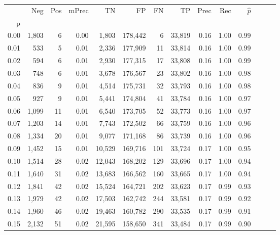 \begin{tabular}{rrrrrrrrrrrrrr}
\toprule
{} &    Neg &  Pos & mPrec &       TN &       FP &      FN &      TP &  Prec &   Rec & $\hat{p}$ \\
p    &        &      &       &          &          &         &         &       &       &           \\
\midrule
0.00 &  1,803 &    6 &  0.00 &    1,803 &  178,442 &       6 &  33,819 &  0.16 &  1.00 &      0.99 \\
0.01 &    533 &    5 &  0.01 &    2,336 &  177,909 &      11 &  33,814 &  0.16 &  1.00 &      0.99 \\
0.02 &    594 &    6 &  0.01 &    2,930 &  177,315 &      17 &  33,808 &  0.16 &  1.00 &      0.99 \\
0.03 &    748 &    6 &  0.01 &    3,678 &  176,567 &      23 &  33,802 &  0.16 &  1.00 &      0.98 \\
0.04 &    836 &    9 &  0.01 &    4,514 &  175,731 &      32 &  33,793 &  0.16 &  1.00 &      0.98 \\
0.05 &    927 &    9 &  0.01 &    5,441 &  174,804 &      41 &  33,784 &  0.16 &  1.00 &      0.97 \\
0.06 &  1,099 &   11 &  0.01 &    6,540 &  173,705 &      52 &  33,773 &  0.16 &  1.00 &      0.97 \\
0.07 &  1,203 &   14 &  0.01 &    7,743 &  172,502 &      66 &  33,759 &  0.16 &  1.00 &      0.96 \\
0.08 &  1,334 &   20 &  0.01 &    9,077 &  171,168 &      86 &  33,739 &  0.16 &  1.00 &      0.96 \\
0.09 &  1,452 &   15 &  0.01 &   10,529 &  169,716 &     101 &  33,724 &  0.17 &  1.00 &      0.95 \\
0.10 &  1,514 &   28 &  0.02 &   12,043 &  168,202 &     129 &  33,696 &  0.17 &  1.00 &      0.94 \\
0.11 &  1,640 &   31 &  0.02 &   13,683 &  166,562 &     160 &  33,665 &  0.17 &  1.00 &      0.94 \\
0.12 &  1,841 &   42 &  0.02 &   15,524 &  164,721 &     202 &  33,623 &  0.17 &  0.99 &      0.93 \\
0.13 &  1,979 &   42 &  0.02 &   17,503 &  162,742 &     244 &  33,581 &  0.17 &  0.99 &      0.92 \\
0.14 &  1,960 &   46 &  0.02 &   19,463 &  160,782 &     290 &  33,535 &  0.17 &  0.99 &      0.91 \\
0.15 &  2,132 &   51 &  0.02 &   21,595 &  158,650 &     341 &  33,484 &  0.17 &  0.99 &      0.90 \\

\end{tabular}
